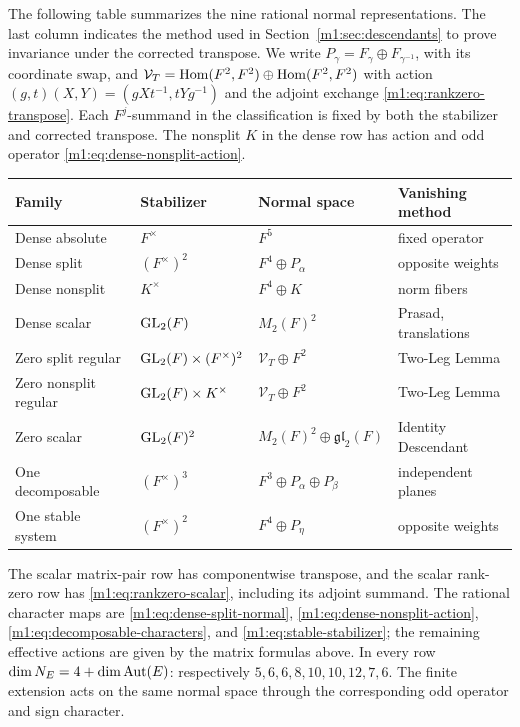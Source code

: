 The following table summarizes the nine rational normal
representations. The last column indicates the method used in
Section~\ref{m1:sec:descendants} to prove invariance under the
corrected transpose. We write
$P_\gamma=F_\gamma\oplus F_{\gamma^{-1}}$, with its coordinate swap,
and $\mathcal V_T=\operatorname{Hom}(F^2,F^2)\oplus\operatorname{Hom}(F^2,F^2)$ with action
$(g,t)(X,Y)=(gXt^{-1},tYg^{-1})$ and the adjoint exchange
\eqref{m1:eq:rankzero-transpose}. Each $F^j$-summand in the classification is fixed by both
the stabilizer and corrected transpose. The nonsplit $K$ in the dense
row has action and odd operator \eqref{m1:eq:dense-nonsplit-action}.
\begin{center}
\small
\begin{tabular}{@{}llll@{}}
\toprule
Family & Stabilizer & Normal space & Vanishing method\\
\midrule
Dense absolute & $F^\times$ & $F^5$ & fixed operator\\
Dense split & $(F^\times)^2$ & $F^4\oplus P_\alpha$ & opposite weights\\
Dense nonsplit & $K^\times$ & $F^4\oplus K$ & norm fibers\\
Dense scalar & $\operatorname{GL}_2(F)$ & $M_2(F)^2$ & Prasad, translations\\
Zero split regular & $\operatorname{GL}_2(F)\times(F^\times)^2$ & $\mathcal V_T\oplus F^2$ & Two-Leg Lemma\\
Zero nonsplit regular & $\operatorname{GL}_2(F)\times K^\times$ & $\mathcal V_T\oplus F^2$ & Two-Leg Lemma\\
Zero scalar & $\operatorname{GL}_2(F)^2$ & $M_2(F)^2\oplus\mathfrak{gl}_2(F)$ & Identity Descendant\\
One decomposable & $(F^\times)^3$ & $F^3\oplus P_\alpha\oplus P_\beta$ & independent planes\\
One stable system & $(F^\times)^2$ & $F^4\oplus P_\eta$ & opposite weights\\
\bottomrule
\end{tabular}
\end{center}
The scalar matrix-pair row has componentwise transpose, and the scalar
rank-zero row has \eqref{m1:eq:rankzero-scalar}, including its adjoint
summand. The rational character maps are
\eqref{m1:eq:dense-split-normal}, \eqref{m1:eq:dense-nonsplit-action},
\eqref{m1:eq:decomposable-characters}, and \eqref{m1:eq:stable-stabilizer};
the remaining effective actions are given by the matrix formulas above.
In every row $\dim N_E=4+\dim\operatorname{Aut}(E)$: respectively
$5,6,6,8,10,10,12,7,6$. The finite extension acts on the same normal space through the corresponding
odd operator and sign character.

